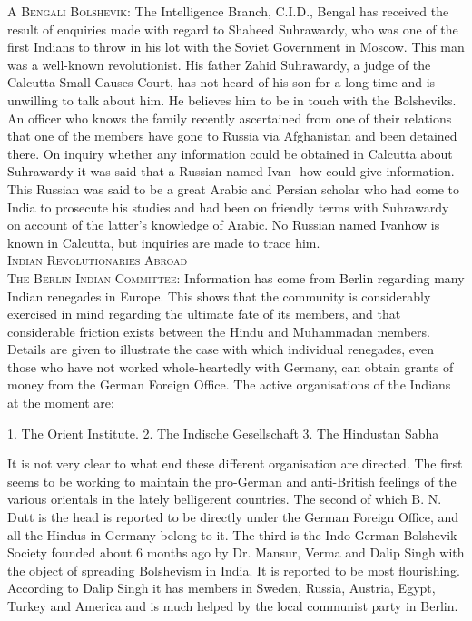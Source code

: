 \textsc{A Bengali Bolshevik:} The Intelligence Branch, C.I.D., Bengal has received the result of enquiries made with regard to Shaheed Suhrawardy, who was one of the first Indians to throw in his lot with the Soviet Government in Moscow. This man was a well-known revolutionist. His father Zahid Suhrawardy, a judge of the Calcutta Small Causes Court, has not heard of his son for a long time and is unwilling to talk about him. He believes him to be in touch with the Bolsheviks. An officer who knows the family recently ascertained from one of their relations that one of the members have gone to Russia via Afghanistan and been detained there. On inquiry whether any information could be obtained in Calcutta about Suhrawardy it was said that a Russian named Ivan- how could give information. This Russian was said to be a great Arabic and Persian scholar who had come to India to prosecute his studies and had been on friendly terms with Suhrawardy on account of the latter’s knowledge of Arabic. No Russian named Ivanhow is known in Calcutta, but inquiries are made to trace him.\\

\textsc{Indian Revolutionaries Abroad}\\ 

\textsc{The Berlin Indian Committee:} Information has come from Berlin regarding many Indian renegades in Europe. This shows that the community is considerably exercised in mind regarding the ultimate fate of its members, and that considerable friction exists between the Hindu and Muhammadan members. Details are given to illustrate the case with which individual renegades, even those who have not worked whole-heartedly with Germany, can obtain grants of money 
from the German Foreign Office. The active organisations of the Indians at the moment are: 

1. The Orient Institute. 
2. The Indische Gesellschaft 
3. The Hindustan Sabha 

It is not very clear to what end these different organisation are directed. The first seems to be working to maintain the pro-German and anti-British feelings of the various orientals in the lately belligerent countries. The second of which B. N. Dutt is the head is reported to be directly under the German Foreign Office, and all the Hindus in Germany belong to it. The third is the Indo-German Bolshevik Society founded about 6 months ago by Dr. Mansur, Verma and Dalip Singh with the object of spreading Bolshevism in India. It is reported to be most flourishing. According to Dalip Singh it has members in Sweden, Russia, Austria, Egypt, Turkey and America and is much helped by the local communist party in Berlin. \\

